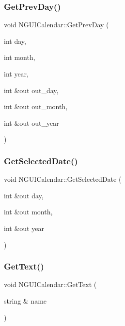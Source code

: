 \hypertarget{class_n_g_u_i_calendar_a55e495051ab1e07cfa9ee2432115dd1e}{}\label{class_n_g_u_i_calendar_a55e495051ab1e07cfa9ee2432115dd1e} 
\subsubsection{\texorpdfstring{Get\+Prev\+Day()}{GetPrevDay()}}
{\footnotesize\ttfamily void N\+G\+U\+I\+Calendar\+::\+Get\+Prev\+Day (\begin{DoxyParamCaption}\item[{int}]{day,  }\item[{int}]{month,  }\item[{int}]{year,  }\item[{int \&out}]{out\+\_\+day,  }\item[{int \&out}]{out\+\_\+month,  }\item[{int \&out}]{out\+\_\+year }\end{DoxyParamCaption})}

\hypertarget{class_n_g_u_i_calendar_a5541e59843c3fa0f0e28b981929a889c}{}\label{class_n_g_u_i_calendar_a5541e59843c3fa0f0e28b981929a889c} 
\subsubsection{\texorpdfstring{Get\+Selected\+Date()}{GetSelectedDate()}}
{\footnotesize\ttfamily void N\+G\+U\+I\+Calendar\+::\+Get\+Selected\+Date (\begin{DoxyParamCaption}\item[{int \&out}]{day,  }\item[{int \&out}]{month,  }\item[{int \&out}]{year }\end{DoxyParamCaption})}

\hypertarget{class_n_g_u_i_calendar_a17f88e0f70bcbdb67c5b8c47bac53bec}{}\label{class_n_g_u_i_calendar_a17f88e0f70bcbdb67c5b8c47bac53bec} 
\subsubsection{\texorpdfstring{Get\+Text()}{GetText()}}
{\footnotesize\ttfamily void N\+G\+U\+I\+Calendar\+::\+Get\+Text (\begin{DoxyParamCaption}\item[{string \&}]{name }\end{DoxyParamCaption})}

